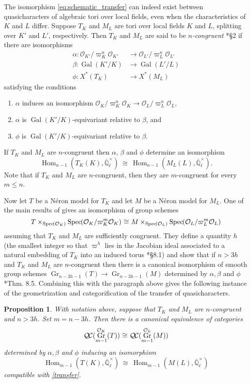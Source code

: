 \documentclass[10pt]{amsart}
\theoremstyle{plain}
\newtheorem{proposition}[theorem]{Proposition}
\theoremstyle{definition}
\theoremstyle{remark}
\newcommand{\EE}{\mathbb{\bar Q}_\ell}
\newcommand{\OK}{\mathcal{O}_K}
\newcommand{\OL}{\mathcal{O}_L}
\newcommand{\OO}[1]{\mathcal{O}_{#1}}
\newcommand{\EEx}{\EE^\times}
\DeclareMathOperator{\Gal}{Gal}
\DeclareMathOperator{\Hom}{Hom}
\DeclareMathOperator{\Gr}{Gr}
\newcommand{\Spec}[1]{{\operatorname{Spec}\hskip-1pt( #1 )}}
\newcommand{\iso}{{\ \cong\ }}
\newcommand{\QC}{{\mathcal{Q\hskip-0.8pt C}}}
\begin{document}
The isomorphism \eqref{eq:schematic_transfer} can indeed exist between quasicharacters of algebraic tori over local fields, even when the characteristics of $K$ and $L$ differ.
Suppose $T_K$ and $M_L$ are tori over local fields $K$ and $L$,
splitting over $K'$ and $L'$, respectively.
Then $T_K$ and $M_L$ are said to be \emph{$n$-congruent} \cite{chai-yu:01a}*{\S 2} if there are isomorphisms
 \begin{align*}
  \alpha : \OO{K'}/\varpi_K^n \OO{K'} &\to \OO{L'}/\varpi_{L}^n \OO{L'} \\
  \beta : \Gal(K'/K) &\to \Gal(L'/L) \\
  \phi : X^*(T_K) &\to X^*(M_L)
 \end{align*}
 satisfying the conditions
 \begin{enumerate}
  \item $\alpha$ induces an isomorphism $\OK/\varpi_K^n \OK \to \OO{L}/\varpi_{L}^n \OO{L}$,
  \item $\alpha$ is $\Gal(K'/K)$-equivariant relative to $\beta$, and
  \item $\phi$ is $\Gal(K'/K)$-equivariant relative to $\beta$.
 \end{enumerate}
If $T_K$ and $M_L$ are $n$-congruent then $\alpha$, $\beta$ and $\phi$ determine an isomorphism 
\begin{equation}\label{transfer}
  \Hom_{n-1}(T_K(K), \EEx) \iso \Hom_{n-1}(M_L(L),\EEx).
\end{equation}
Note that if $T_K$ and $M_L$ are $n$-congruent, then they are $m$-congruent for every
$m \leq n$.

Now let $T$ be a N\'eron model for $T_K$ and let $M$ be a N\'eron model for $M_L$.
One of the main results of \cite{chai-yu:01a} gives an isomorphism of group schemes 
\[
T \times_{\Spec{\OK}} \Spec{\OK/\varpi_K^m\OK} \iso M \times_{\Spec{\OL}} \Spec{\OL/\varpi_L^m\OL}
\] 
assuming that $T_K$ and $M_L$ are sufficiently congruent.
They define a quantity $h$ (the smallest integer so that $\varpi^h$ lies in the
Jacobian ideal associated to a natural embedding of $T_K$ into an induced torus \cite{chai-yu:01a}*{\S 8.1}) and show  that if $n > 3h$ and $T_K$ and $M_L$ are $n$-congruent then there is a canonical isomorphism of smooth group schemes
 $
\Gr_{n-3h-1}(T) \to \Gr_{n-3h-1}(M)
 $
 determined by $\alpha, \beta$ and $\phi$ \cite{chai-yu:01a}*{Thm. 8.5}.
Combining this with the paragraph above gives the following instance of the geometrization and categorification of the transfer of quasicharacters.

\begin{proposition}\label{prop:transfer}
 With notation above, suppose that $T_K$ and $M_L$ are $n$-congruent and $n > 3h$.  Set $m = n-3h$.
 Then there is a canonical equivalence of categories
 \[
 \QC(\Gr^{\OK}_{m-1}(T)) \iso \QC(\Gr^{\OL}_{m-1}(M))
 \]
 determined by $\alpha, \beta$ and $\phi$ inducing an isomorphism
 \[
\Hom_{m-1}(T(K), \EEx) \iso  \Hom_{m-1}(M(L), \EEx)
 \]
compatible with \eqref{transfer}.
\end{proposition}

   
\end{document}
